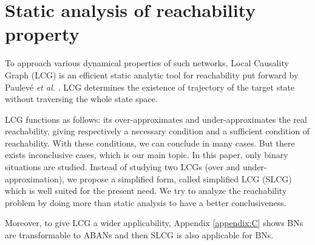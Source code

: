 \documentclass[runningheads]{llncs}
\begin{document}
\section{Static analysis of reachability property}\label{sect:3}
To approach various dynamical properties of such networks, Local Causality Graph (LCG) is an efficient static analytic tool for reachability put forward by Paulev\'e \textit{et al.} \cite{pauleve2011}. 
LCG determines the existence of trajectory of the target state without traversing the whole state space.

LCG functions as follows: its over-approximates and under-approximates the real reachability, giving respectively a necessary condition and a sufficient condition of reachability. 
With these conditions, we can conclude in many cases.
But there exists inconclusive cases, which is our main topic.
In this paper, only binary situations are studied.
Instead of studying two LCGs (over and under-approximation), we propose a simplified form, called simplified LCG (SLCG) which is well suited for the present need.
We try to analyze the reachability problem by doing more than static analysis to have a better conclusiveness.

Moreover, to give LCG a wider applicability, Appendix \ref{appendix:C} shows BNs are transformable to ABANs and then SLCG is also applicable for BNs.
\end{document}
